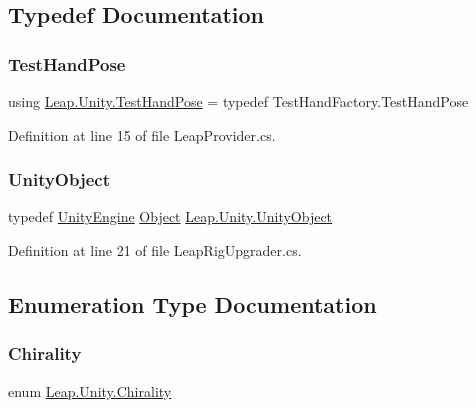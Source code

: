 \subsection{Typedef Documentation}
\mbox{\label{namespace_leap_1_1_unity_acd6a6baee36c0cbe733c12b87791f963}} 
\subsubsection{\texorpdfstring{TestHandPose}{TestHandPose}}
{\footnotesize\ttfamily using \mbox{\hyperlink{namespace_leap_1_1_unity_acd6a6baee36c0cbe733c12b87791f963}{Leap.\+Unity.\+Test\+Hand\+Pose}} = typedef Test\+Hand\+Factory.\+Test\+Hand\+Pose}



Definition at line 15 of file Leap\+Provider.\+cs.

\mbox{\label{namespace_leap_1_1_unity_aa7911d55a8e7b4f29baff562ebffea48}} 
\subsubsection{\texorpdfstring{UnityObject}{UnityObject}}
{\footnotesize\ttfamily typedef \mbox{\hyperlink{_balloon_8cs_a7d67e097df9376eb709b6a23aa3c7d23}{Unity\+Engine}} \mbox{\hyperlink{_t_m_pro___font_asset_creator_window_8cs_aef19bab18b9814edeef255c43e4f6bbc}{Object}} \mbox{\hyperlink{namespace_leap_1_1_unity_1_1_attributes_a71d15e38cb19d7d2ffb1aa310ce8f0f9}{Leap.\+Unity.\+Unity\+Object}}}



Definition at line 21 of file Leap\+Rig\+Upgrader.\+cs.



\subsection{Enumeration Type Documentation}
\mbox{\label{namespace_leap_1_1_unity_a4d15adcf20ba121b2cd9c07f503b606f}} 
\subsubsection{\texorpdfstring{Chirality}{Chirality}}
{\footnotesize\ttfamily enum \mbox{\hyperlink{namespace_leap_1_1_unity_a4d15adcf20ba121b2cd9c07f503b606f}{Leap.\+Unity.\+Chirality}}\hspace{0.3cm}{\ttfamily [strong]}}

